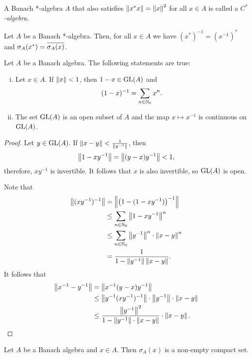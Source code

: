 \begin{definicija}
A Banach *-algebra $A$ that also satisfies
$\left\lVert x^* x\right\rVert = \left\lVert x\right\rVert^2$ for all $x \in A$ is called a
\emph{$C^*$-algebra}.
\end{definicija}

\begin{trditev}
Let $A$ be a Banach *-algebra. Then, for all $x \in A$ we have
$(x^*)^{-1} = (x^{-1})^*$ and
$\sigma_A(x^*) = \overline{\sigma_A(x)}$.
\end{trditev}

\begin{trditev}
Let $A$ be a Banach algebra. The following statements are true:

\begin{enumerate}[i)]
\item Let $x \in A$. If $\left\lVert x\right\rVert < 1$, then $1 - x \in \operatorname{GL}(A)$ and
\[
(1-x)^{-1} = \sum_{n \in \mathbb{N}_0} x^n.
\]
\item The set $\operatorname{GL}(A)$ is an open subset of $A$ and the map
$x \mapsto x^{-1}$ is continuous on $\operatorname{GL}(A)$.
\end{enumerate}
\end{trditev}

\begin{proof}
Let $y \in \operatorname{GL}(A)$. If $\left\lVert x-y\right\rVert < \frac{1}{\left\lVert y^{-1}\right\rVert}$, then
\[
\left\lVert 1-xy^{-1}\right\rVert = \left\lVert (y-x) y^{-1}\right\rVert < 1,
\]
therefore, $xy^{-1}$ is invertible. It follows that $x$ is also
invertible, so $\operatorname{GL}(A)$ is open.

Note that
\begin{align*}
\left\lVert (xy^{-1})^{-1}\right\rVert &=
\left\lVert \left(1 - (1 - xy^{-1})\right)^{-1}\right\rVert
\\
&\leq
\sum_{n \in \mathbb{N}_0} \left\lVert 1 - xy^{-1}\right\rVert^n
\\
&\leq
\sum_{n \in \mathbb{N}_0} \left\lVert y^{-1}\right\rVert^n \cdot \left\lVert x-y\right\rVert^n
\\
&=
\frac{1}{1 - \left\lVert y^{-1}\right\rVert \left\lVert x-y\right\rVert}.
\end{align*}
It follows that
\begin{align*}
\left\lVert x^{-1} - y^{-1}\right\rVert &=
\left\lVert x^{-1} (y-x) y^{-1}\right\rVert
\\
&\leq
\left\lVert y^{-1} (xy^{-1})^{-1}\right\rVert \cdot
\left\lVert y^{-1}\right\rVert \cdot \left\lVert x-y\right\rVert
\\
&\leq
\frac{\left\lVert y^{-1}\right\rVert^2}{1 - \left\lVert y^{-1}\right\rVert \cdot \left\lVert x-y\right\rVert} \cdot
\left\lVert x-y\right\rVert. \qedhere
\end{align*}
\end{proof}

\begin{trditev}
Let $A$ be a Banach algebra and $x \in A$. Then $\sigma_A(x)$ is a
non-empty compact set.
\end{trditev}

